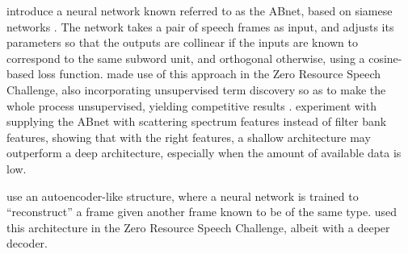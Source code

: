 \textcite{synnaeve2014phonetics} introduce a neural network known referred to as the ABnet, based on siamese networks \parencite{bromley1994signature}.
The network takes a pair of speech frames as input, and adjusts its parameters so that the outputs are collinear if the inputs are known to correspond to the same subword unit, and orthogonal otherwise, using a cosine-based loss function.
\textcite{thiolliere2015hybrid} made use of this approach in the Zero Resource Speech Challenge, also incorporating unsupervised term discovery so as to make the whole process unsupervised, yielding competitive results \parencite{versteegh2016zero}.
\textcite{zeghidour2016deep} experiment with supplying the ABnet with scattering spectrum features instead of filter bank features, showing that with the right features, a shallow architecture may outperform a deep architecture, especially when the amount of available data is low.

\textcite{kamper2015unsupervised} use an autoencoder-like structure, where a neural network is trained to ``reconstruct'' a frame given another frame known to be of the same type.
\textcite{renshaw2015comparison} used this architecture in the Zero Resource Speech Challenge, albeit with a deeper decoder.
